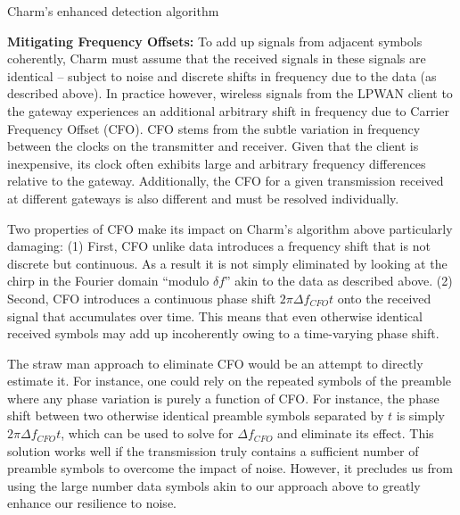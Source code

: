 \LinesNumbered
\begin{algorithm}[ht]
\caption{Charm's enhanced detection algorithm}
\label{alg:algorithm-label2}
\end{algorithm}

\noindent \textbf{Mitigating Frequency Offsets: } To add up signals from
adjacent symbols coherently, Charm must assume that the received signals in
these signals are identical -- subject to noise and discrete shifts in
frequency due to the data (as described above). In practice however, wireless
signals from the LPWAN client to the gateway experiences an additional
arbitrary shift in frequency due to Carrier Frequency Offset (CFO). CFO stems
from the subtle variation in frequency between the clocks on the transmitter
and receiver. Given that the client is inexpensive, its clock often exhibits
large and arbitrary frequency differences relative to the gateway.
Additionally, the CFO for a given transmission received at different gateways
is also different and must be resolved individually.

Two properties of CFO make its impact on Charm's algorithm above particularly
damaging: (1) First, CFO unlike data introduces a frequency shift that is not
discrete but continuous. As a result it is not simply eliminated by looking at
the chirp in the Fourier domain ``modulo $\delta f$''  akin to the data as
described above. (2) Second, CFO introduces a continuous phase shift $2 \pi
\Delta f_{CFO} t$ onto the received signal that accumulates over time. This
means that even otherwise identical received symbols may add up incoherently
owing to a time-varying phase shift.

The straw man approach to eliminate CFO would be an attempt to directly
estimate it. For instance, one could rely on the repeated symbols of the
preamble where any phase variation is purely a function of CFO. For instance,
the phase shift between two otherwise identical preamble symbols separated by
$t$ is simply $2 \pi \Delta f_{CFO} t$, which can be used to solve for $\Delta
f_{CFO}$ and eliminate its effect. This solution works well if the
transmission truly contains a sufficient number of preamble symbols to
overcome the impact of noise. However, it precludes us from using the large
number data symbols akin to our approach above to greatly enhance our
resilience to noise.

